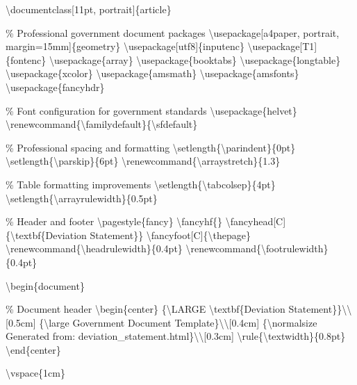 \textbackslash{}documentclass[11pt, portrait]\{article\}

\% Professional government document packages
\textbackslash{}usepackage[a4paper, portrait, margin=15mm]\{geometry\}
\textbackslash{}usepackage[utf8]\{inputenc\}
\textbackslash{}usepackage[T1]\{fontenc\}
\textbackslash{}usepackage\{array\}
\textbackslash{}usepackage\{booktabs\}
\textbackslash{}usepackage\{longtable\}
\textbackslash{}usepackage\{xcolor\}
\textbackslash{}usepackage\{amsmath\}
\textbackslash{}usepackage\{amsfonts\}
\textbackslash{}usepackage\{fancyhdr\}

\% Font configuration for government standards
\textbackslash{}usepackage\{helvet\}
\textbackslash{}renewcommand\{\textbackslash{}familydefault\}\{\textbackslash{}sfdefault\}

\% Professional spacing and formatting
\textbackslash{}setlength\{\textbackslash{}parindent\}\{0pt\}
\textbackslash{}setlength\{\textbackslash{}parskip\}\{6pt\}
\textbackslash{}renewcommand\{\textbackslash{}arraystretch\}\{1.3\}

\% Table formatting improvements
\textbackslash{}setlength\{\textbackslash{}tabcolsep\}\{4pt\}
\textbackslash{}setlength\{\textbackslash{}arrayrulewidth\}\{0.5pt\}

\% Header and footer
\textbackslash{}pagestyle\{fancy\}
\textbackslash{}fancyhf\{\}
\textbackslash{}fancyhead[C]\{\textbackslash{}textbf\{Deviation Statement\}\}
\textbackslash{}fancyfoot[C]\{\textbackslash{}thepage\}
\textbackslash{}renewcommand\{\textbackslash{}headrulewidth\}\{0.4pt\}
\textbackslash{}renewcommand\{\textbackslash{}footrulewidth\}\{0.4pt\}

\textbackslash{}begin\{document\}

\% Document header
\textbackslash{}begin\{center\}
\{\textbackslash{}LARGE \textbackslash{}textbf\{Deviation Statement\}\}\textbackslash{}\textbackslash{}[0.5cm]
\{\textbackslash{}large Government Document Template\}\textbackslash{}\textbackslash{}[0.4cm]
\{\textbackslash{}normalsize Generated from: deviation\_statement.html\}\textbackslash{}\textbackslash{}[0.3cm]
\textbackslash{}rule\{\textbackslash{}textwidth\}\{0.8pt\}
\textbackslash{}end\{center\}

\textbackslash{}vspace\{1cm\}

